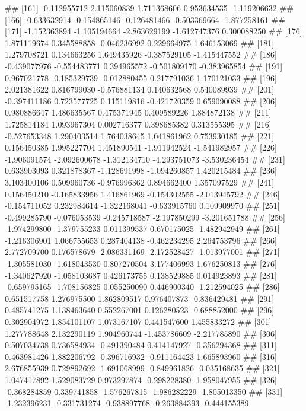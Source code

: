 \documentclass[
]{article}
\begin{document}
\begin{enumerate}[label=(\alph*)]
##  [161] -0.112955712  2.115060839  1.711368606  0.953634535 -1.119206632
##  [166] -0.633632914 -0.154865146 -0.126481466 -0.503369664 -1.877258161
##  [171] -1.152363894 -1.105194664 -2.863629199 -1.612747376  0.300088250
##  [176]  1.871119674  0.345588858 -0.046236992  0.229664975  1.646153069
##  [181]  1.279708721  0.134663256  1.649435926 -0.387529105 -1.415447552
##  [186] -0.439077976 -0.554483771  0.394965572 -0.501809170 -0.383965854
##  [191]  0.967021778 -0.185329739 -0.012880455  0.217791036  1.170121033
##  [196]  2.021381622  0.816799030 -0.576881134  0.140632568  0.540089939
##  [201] -0.397411186  0.723577725  0.115119816 -0.421720359  0.659090088
##  [206]  0.980886647  1.486635567  0.475371945  0.409589226  1.884872138
##  [211]  1.725814184  1.093967304  0.002716377  0.398685382  0.313555395
##  [216] -0.527653348  1.290403514  1.764038645  1.041861962  0.753930185
##  [221]  0.156450385  1.995227704  1.451890541 -1.911942524 -1.541982957
##  [226] -1.906091574 -2.092600678 -1.312134710 -4.293751073 -3.530236454
##  [231]  0.633903093  0.321878367 -1.128691998 -1.094260857  1.420215484
##  [236]  3.103400106  0.509960736 -0.976996362  0.894662400  1.357097529
##  [241]  0.156450210 -0.165833956  1.416861969 -0.154302555 -2.013945792
##  [246] -0.154711052  0.232984614 -1.322168041 -0.633915760  0.109909970
##  [251] -0.499285790 -0.076053539 -0.245718587 -2.197850299 -3.201651788
##  [256] -1.974299800 -1.379755233  0.011399537  0.670175025 -1.482942949
##  [261] -1.216306901  1.066755653  0.287404138 -0.462234295  2.264753796
##  [266]  2.772709700  0.176578679 -2.086331169 -2.172528427 -1.013977001
##  [271] -1.305581030 -1.618043530  0.807270504  3.177406993  1.676250813
##  [276] -1.340627920 -1.058103687  0.426173755  0.138529885  0.014923893
##  [281] -0.659795165 -1.708156825  0.055250090  0.446900340 -1.212594025
##  [286]  0.651517758  1.276975500  1.862809517  0.976407873 -0.836429481
##  [291]  0.485741275  1.138463640  0.552267001  0.126280523 -0.688852000
##  [296]  0.302904972  1.854101107  1.073167107  0.441547600  1.455833272
##  [301]  1.277788648  2.132290119  1.904960744 -1.453786609 -2.217785890
##  [306]  0.507034738  0.736584934 -0.491390484  0.414147927 -0.356294368
##  [311]  0.463981426  1.882206792 -0.396716932 -0.911164423  1.665893960
##  [316]  2.676855939  0.729892692 -1.691068999 -0.849961826 -0.035168635
##  [321]  1.047417892  1.529083729  0.973297874 -0.298228380 -1.958047955
##  [326] -0.368284859  0.339741858 -1.576267815 -1.986282229 -1.805013350
##  [331] -1.232396231 -0.331731274 -0.938897768 -0.263884393 -0.444155389

\end{enumerate}
\end{document}
